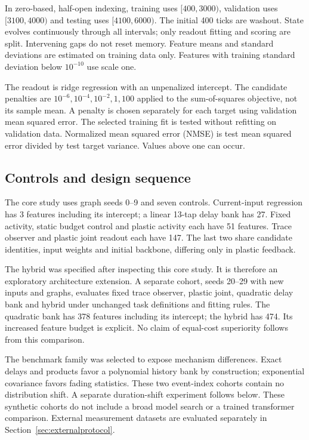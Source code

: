 \documentclass[11pt,a4paper]{article}
\theoremstyle{definition}\newtheorem{definition}[theorem]{Definition}
\begin{document}
In zero-based, half-open indexing, training uses $[400,3000)$, validation uses $[3100,4000)$ and testing uses $[4100,6000)$. The initial 400 ticks are washout. State evolves continuously through all intervals; only readout fitting and scoring are split. Intervening gaps do not reset memory. Feature means and standard deviations are estimated on training data only. Features with training standard deviation below $10^{-10}$ use scale one.

The readout is ridge regression with an unpenalized intercept. The candidate penalties are $10^{-6},10^{-4},10^{-2},1,100$ applied to the sum-of-squares objective, not its sample mean. A penalty is chosen separately for each target using validation mean squared error. The selected training fit is tested without refitting on validation data. Normalized mean squared error (NMSE) is test mean squared error divided by test target variance. Values above one can occur.

\subsection{Controls and design sequence}
The core study uses graph seeds 0--9 and seven controls. Current-input regression has 3 features including its intercept; a linear 13-tap delay bank has 27. Fixed activity, static budget control and plastic activity each have 51 features. Trace observer and plastic joint readout each have 147. The last two share candidate identities, input weights and initial backbone, differing only in plastic feedback.

The hybrid was specified after inspecting this core study. It is therefore an exploratory architecture extension. A separate cohort, seeds 20--29 with new inputs and graphs, evaluates fixed trace observer, plastic joint, quadratic delay bank and hybrid under unchanged task definitions and fitting rules. The quadratic bank has 378 features including its intercept; the hybrid has 474. Its increased feature budget is explicit. No claim of equal-cost superiority follows from this comparison.

The benchmark family was selected to expose mechanism differences. Exact delays and products favor a polynomial history bank by construction; exponential covariance favors fading statistics. These two event-index cohorts contain no distribution shift. A separate duration-shift experiment follows below. These synthetic cohorts do not include a broad model search or a trained transformer comparison. External measurement datasets are evaluated separately in Section~\ref{sec:externalprotocol}.
\end{document}
